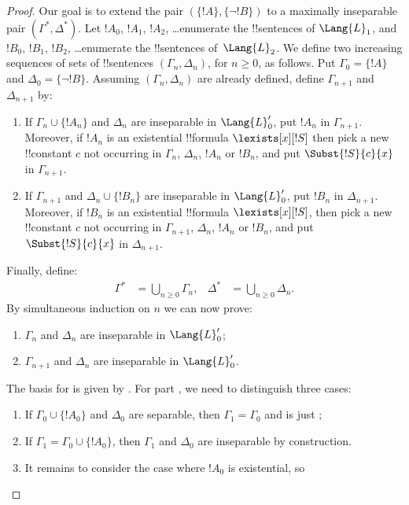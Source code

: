 \documentclass[../../../include/open-logic-section]{subfiles}
\begin{document}
\begin{proof}
Our goal is to extend the pair $(\{ !A \}, \{\lnot!B\})$ to a
maximally inseparable pair $(\Gamma^*, \Delta^*)$.  Let $!A_0$,
$!A_1$, $!A_2$, \dots enumerate the !!{sentence}s of $\Lang{L}_1$, and
$!B_0$, $!B_1$, $!B_2$, \dots enumerate the !!{sentence}s
of~$\Lang{L}_2$. We define two increasing sequences of sets of
!!{sentence}s $(\Gamma_n, \Delta_n)$, for $n \ge 0$, as follows. Put
$\Gamma_0 = \{ !A\}$ and $\Delta_0 = \{\lnot !B \}$. Assuming
$(\Gamma_n, \Delta_n)$ are already defined, define $\Gamma_{n+1}$ and
$\Delta_{n+1}$ by:
\begin{enumerate}
\item If $\Gamma_n \cup \{!A_n \}$ and $\Delta_n$ are inseparable in
  $\Lang{L}'_0$, put $!A_n$ in $\Gamma_{n+1}$. Moreover, if $!A_n$ is
  an existential !!{formula} $\lexists[x][!S]$ then pick a new
  !!{constant} $c$ not occurring in $\Gamma_n$, $\Delta_n$, $!A_n$ or
  $!B_n$, and put $\Subst{!S}{c}{x}$ in $\Gamma_{n+1}$.
\item If $\Gamma_{n+1}$ and $\Delta_n \cup \{!B_n \}$ are inseparable
  in $\Lang{L}'_0$, put $!B_n$ in $\Delta_{n+1}$. Moreover, if $!B_n$
  is an existential !!{formula} $\lexists[x][!S]$, then pick a new
  !!{constant} $c$ not occurring in $\Gamma_{n+1}$, $\Delta_n$, $!A_n$
  or $!B_n$, and put $\Subst{!S}{c}{x}$ in $\Delta_{n+1}$.
\end{enumerate}
Finally, define:
\begin{align*}
  \Gamma^* & = \bigcup_{n\ge 0} \Gamma_n, & 
  \Delta^* & = \bigcup_{n\ge 0} \Delta_n.
\end{align*}
By simultaneous induction on $n$ we can now prove:
\begin{enumerate}
\item{} $\Gamma_n$ and $\Delta_n$ are inseparable in
  $\Lang{L}'_0$;
\item{} $\Gamma_{n+1}$ and $\Delta_n$ are inseparable in
    $\Lang{L}'_0$.
\end{enumerate}
The basis for  is given by . For
part , we need to distinguish three cases:
\begin{enumerate}
\item If $\Gamma_0 \cup \{!A_0 \}$ and $\Delta_0$ are separable, then
  $\Gamma_1 = \Gamma_0$ and  is just ;
\item If $\Gamma_1 = \Gamma_0 \cup\{ !A_0\}$, then $\Gamma_1$ and
  $\Delta_0$ are inseparable by construction.
\item It remains to consider the case where $!A_0$ is existential, so

\end{enumerate}
\end{proof}
\end{document}
